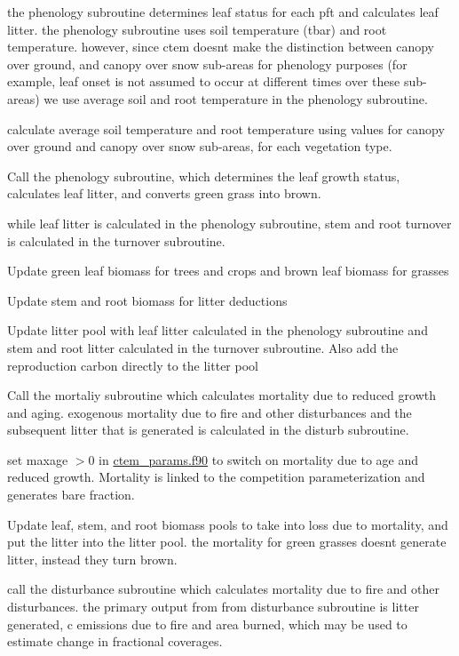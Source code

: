 the phenology subroutine determines leaf status for each pft and calculates leaf litter. the phenology subroutine uses soil temperature (tbar) and root temperature. however, since ctem doesn\textquotesingle{}t make the distinction between canopy over ground, and canopy over snow sub-\/areas for phenology purposes (for example, leaf onset is not assumed to occur at different times over these sub-\/areas) we use average soil and root temperature in the phenology subroutine.

calculate average soil temperature and root temperature using values for canopy over ground and canopy over snow sub-\/areas, for each vegetation type.

Call the phenology subroutine, which determines the leaf growth status, calculates leaf litter, and converts green grass into brown.

while leaf litter is calculated in the phenology subroutine, stem and root turnover is calculated in the turnover subroutine.

Update green leaf biomass for trees and crops and brown leaf biomass for grasses

Update stem and root biomass for litter deductions

Update litter pool with leaf litter calculated in the phenology subroutine and stem and root litter calculated in the turnover subroutine. Also add the reproduction carbon directly to the litter pool

Call the mortaliy subroutine which calculates mortality due to reduced growth and aging. exogenous mortality due to fire and other disturbances and the subsequent litter that is generated is calculated in the disturb subroutine.

set maxage $>$0 in \hyperlink{ctem__params_8f90}{ctem\+\_\+params.\+f90} to switch on mortality due to age and reduced growth. Mortality is linked to the competition parameterization and generates bare fraction.

Update leaf, stem, and root biomass pools to take into loss due to mortality, and put the litter into the litter pool. the mortality for green grasses doesn\textquotesingle{}t generate litter, instead they turn brown.

call the disturbance subroutine which calculates mortality due to fire and other disturbances. the primary output from from disturbance subroutine is litter generated, c emissions due to fire and area burned, which may be used to estimate change in fractional coverages.


